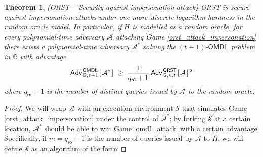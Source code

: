 \documentclass[psamsfonts, reqno]{amsart}
\newtheorem{thm}{Theorem}[section]
\theoremstyle{definition}
\theoremstyle{remark}
\numberwithin{equation}{section}
\begin{document}
\begin{thm}\label{theorem_orst_security}
\textup{(\textsf{ORST} -- \textit{Security against impersonation attack})}
\textup{\textsf{ORST}} is secure against
impersonation attacks under one-more discrete-logarithm
hardness in the random oracle model.
In particular, if $H$ is modelled as a random oracle,
for every polynomial-time adversary $\mathcal{A}$ attacking
Game \textup{\ref{orst_attack_impersonation}}
there exists a polynomial-time adversary $\mathcal{A}^*$
solving the $(t-1)$-$\mathsf{OMDL}$ problem in $\mathbb{G}$
with advantage
\vspace{5pt}
\begin{equation}\label{orst_security_bound}
	\mathsf{Adv}
		_{\hspace{1pt}\mathbb{G},\hspace{1pt} t-1}
		^{\hspace{1pt}\mathsf{OMDL}}
		\hspace{1pt}
		[
			\hspace{1pt}
			\mathcal{A}^*
			\hspace{1pt}
		]
	\hspace{3pt}
	\ge
	\hspace{3pt}
	\frac{1}{q_{\mathsf{ro}} + 1}
	\hspace{2pt}
	\mathsf{Adv}
		_{\hspace{1pt}\mathbb{G}, n, t}
		^{\hspace{1pt}\mathsf{ORST}}
		\hspace{1pt}
		[
			\hspace{1pt}
			\mathcal{A}
			\hspace{1pt}
		] ^ {\hspace{1pt}2}
\vspace{5pt}
\end{equation}
where $q_\mathsf{ro} + 1$ is the number of distinct queries
issued by $\mathcal{A}$ to the random oracle.
\end{thm}

\begin{proof}
We will wrap $\mathcal{A}$ with an execution environment
$\mathcal{S}$ that simulates
Game \ref{orst_attack_impersonation} under the control of
$\mathcal{A}^*$; by
forking $\mathcal{S}$ at a certain location,
$\mathcal{A}^*$ should be able to win Game \ref{omdl_attack}
with a certain advantage. Specifically,
if $m = q_{\mathsf{ro}} + 1$ is the number of queries issued
by $\mathcal{A}$ to $H$, we will define
$\mathcal{S}$ as an algorithm of the form
\end{proof}
\end{document}
